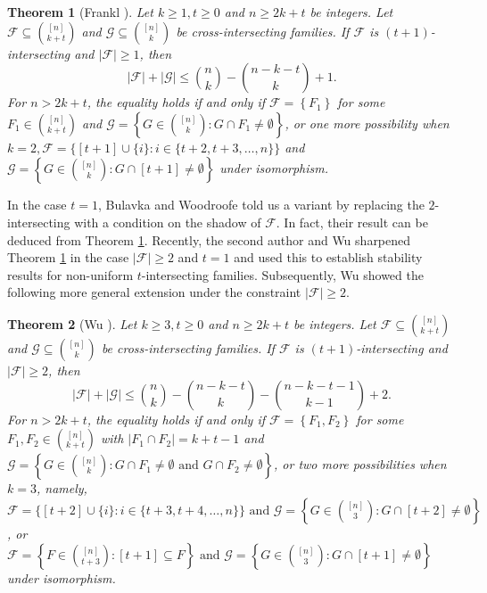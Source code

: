 \documentclass[11pt]{article}
\numberwithin{equation}{section}
\newtheorem{theorem}{Theorem}[section]
\begin{document}
\begin{theorem}[Frankl \cite{F16}] 
\label{F16}
Let $k \geq 1, t\ge 0$ and $n \geq 2 k+t$ be integers.  Let $\mathcal{F} \subseteq\binom{[n]}{k+t}$ and $\mathcal{G} \subseteq\binom{[n]}{k}$ be  cross-intersecting families. If $\mathcal{F}$ is $(t+1)$-intersecting and $|\mathcal{F}| \geq 1$, then
$$
|\mathcal{F}|+|\mathcal{G}| \leq\binom{n}{k}-\binom{n-k-t}{k}+1.
$$
For $n > 2 k+t$, the equality holds if and only if $\mathcal{F}=\left\{F_1\right\}$ for some $F_1\in\binom{[n]}{k+t}$ and $\mathcal{G}=\left\{G \in\binom{[n]}{k}: G \cap F_1 \neq \emptyset \right\}$, or  one more possibility when $k=2, \mathcal{F}=\{[t+1] \cup\{i\}: i \in\{t+2, t+3, \ldots, n\}\}$ and $\mathcal{G}=\left\{G \in\binom{[n]}{k}: G \cap[t+1] \neq \emptyset\right\}$ under isomorphism.
\end{theorem}

In the case $t=1$, Bulavka and Woodroofe \cite{BW2024} told us a variant by replacing the $2$-intersecting with a condition on the shadow of $\mathcal{F}$. In fact, their result can be deduced from  Theorem \ref{F16}.  
Recently, the second author and Wu \cite{L24} sharpened   Theorem \ref{F16} in the case  $|\mathcal{F}|\ge 2$ and $t=1$ and used this to establish stability results for non-uniform $t$-intersecting families.
Subsequently, Wu \cite{W23} showed the following more general extension under the constraint $|\mathcal{F}|\ge 2$.


\begin{theorem}[Wu \cite{W23}] \label{W23}
Let $k \geq 3, t\ge 0$ and $n \geq 2 k+t$ be integers. Let $\mathcal{F} \subseteq\binom{[n]}{k+t}$ and $\mathcal{G} \subseteq\binom{[n]}{k}$ be cross-intersecting families. If $\mathcal{F}$ is $(t+1)$-intersecting and $|\mathcal{F}| \geq 2$, then
$$
|\mathcal{F}|+|\mathcal{G}| \leq\binom{n}{k}-\binom{n-k-t}{k}-\binom{n-k-t-1}{k-1}+2.
$$
For $n > 2 k+t$, the equality holds if and only if $\mathcal{F}=\left\{F_1, F_2\right\}$ for some $F_1, F_2 \in\binom{[n]}{k+t}$ with $\left|F_1 \cap F_2\right|=k+t-1$ and $\mathcal{G}=\left\{G \in\binom{[n]}{k}: G \cap F_1 \neq \emptyset \text{ and } G \cap F_2 \neq \emptyset\right\}$, or two more possibilities when $k=3$, namely, $\mathcal{F}=\{[t+2] \cup\{i\}: i \in\{t+3, t+4, \ldots, n\}\}\text{ and } \mathcal{G}=\left\{G \in\binom{[n]}{3}: G \cap[t+2] \neq \emptyset\right\}$, or $\mathcal{F}=\left\{F\in\binom{[n]}{t+3}: [t+1] \subseteq F\right\}\text{ and }  \mathcal{G}=\left\{G \in\binom{[n]}{3}: G \cap[t+1] \neq \emptyset\right\}$ under isomorphism.
\end{theorem}
\end{document}
